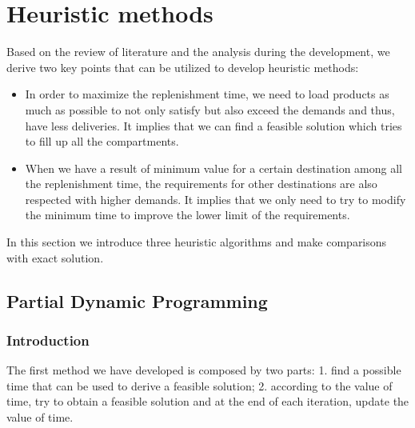 \documentclass{article}
\begin{document}
\section{Heuristic methods}
\label{sec:heu}
Based on the review of literature and the analysis during the development, we derive two key points that can be utilized to develop heuristic methods:
\begin{itemize}
\item In order to maximize the replenishment time, we need to load products as much as possible to not only satisfy but also exceed the demands and thus, have less deliveries. It implies that we can find a feasible solution which tries to fill up all the compartments.
\item When we have a result of minimum value for a certain destination among all the replenishment time, the requirements for other destinations are also respected with higher demands. It implies that we only need to try to modify the minimum time to improve the lower limit of the requirements.
\end{itemize}

In this section we introduce three heuristic algorithms and make comparisons with exact solution.

\subsection{Partial Dynamic Programming}
\subsubsection{Introduction}
The first method we have developed is composed by two parts: 1. find a possible time that can be used to derive a feasible solution; 2. according to the value of time, try to obtain a feasible solution and at the end of each iteration, update the value of time.
\end{document}

